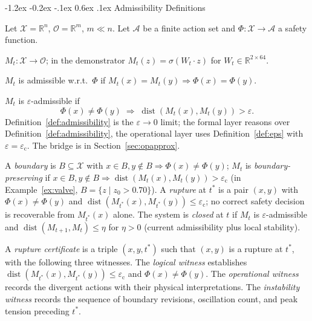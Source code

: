 \documentclass{llncs}
\makeatletter
\renewcommand\section{\@startsection{section}{1}{\z@}%
  {-1.2ex \@plus -0.2ex \@minus -.1ex}%
  {0.6ex \@plus .1ex}%
  {\normalfont\large\bfseries}}
\DeclareMathOperator{\dist}{dist}
\newcommand{\ecollapse}{\varepsilon_{\mathrm{c}}}
\makeatother
\begin{document}
\section{Admissibility Definitions}
\label{sec:defs}

Let $\mathcal{X} = \mathbb{R}^n$, $\mathcal{O} = \mathbb{R}^m$, $m \ll n$.
Let $\mathcal{A}$ be a finite action set and $\Phi : \mathcal{X} \to
\mathcal{A}$ a safety function.

\begin{definition}
\label{def:reduction}
$M_t : \mathcal{X} \to \mathcal{O}$; in the demonstrator $M_t(z) =
\sigma(W_t \cdot z)$ for $W_t \in \mathbb{R}^{2 \times 64}$.
\end{definition}
\begin{definition}
\label{def:admissibility}
$M_t$ is admissible w.r.t.\ $\Phi$ if $M_t(x) = M_t(y) \Rightarrow
\Phi(x) = \Phi(y)$.
\end{definition}
\begin{definition}
\label{def:eps}
$M_t$ is $\varepsilon$-admissible if
\[ \Phi(x) \neq \Phi(y) \;\Rightarrow\; \dist(M_t(x), M_t(y)) > \varepsilon. \]
Definition~\ref{def:admissibility} is the $\varepsilon \to 0$ limit;
the formal layer reasons over Definition~\ref{def:admissibility}, the
operational layer uses Definition~\ref{def:eps} with $\varepsilon =
\ecollapse$. The bridge is in Section~\ref{sec:opapprox}.
\end{definition}

\begin{definition}
\label{def:boundary}\label{def:rupture}\label{def:closure}
A \emph{boundary} is $B \subseteq \mathcal{X}$ with $x \in B, y \notin
B \Rightarrow \Phi(x) \neq \Phi(y)$; $M_t$ is \emph{boundary-preserving}
if $x \in B, y \notin B \Rightarrow \dist(M_t(x), M_t(y)) > \ecollapse$
(in Example~\ref{ex:valve}, $B = \{z \mid z_0 > 0.70\}$). A
\emph{rupture} at $t^*$ is a pair $(x, y)$ with $\Phi(x) \neq \Phi(y)$
and $\dist(M_{t^*}(x), M_{t^*}(y)) \leq \ecollapse$; no correct safety
decision is recoverable from $M_{t^*}(x)$ alone. The system is
\emph{closed} at $t$ if $M_t$ is $\varepsilon$-admissible and
$\dist(M_{t+1}, M_t) \leq \eta$ for $\eta > 0$ (current admissibility
plus local stability).
\end{definition}

\begin{definition}
\label{def:cert}
A \emph{rupture certificate} is a triple $(x, y, t^*)$ such that $(x,y)$
is a rupture at $t^*$, with the following three witnesses. The
\emph{logical witness} establishes
$\dist(M_{t^*}(x), M_{t^*}(y)) \leq \ecollapse$ and
$\Phi(x) \neq \Phi(y)$. The \emph{operational witness} records the
divergent actions with their physical interpretations. The
\emph{instability witness} records the sequence of boundary
revisions, oscillation count, and peak tension preceding $t^*$.
\end{definition}
\end{document}

